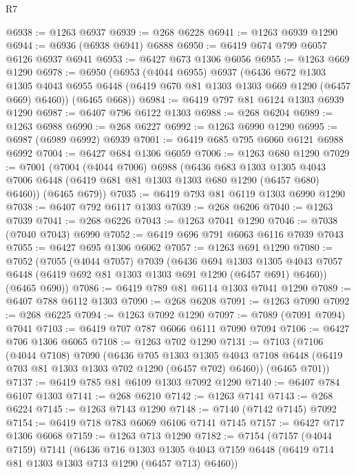 \begin{lexlean}{R7}
\begin{coremodule}
@6938 := @1263 @6937
@6939 := @268 @6228
@6941 := @1263 @6939 @1290
@6944 := @6936 (@6938 @6941) @6888
@6950 := @6419 @674 @799 @6057 @6126 @6937 @6941
@6953 := @6427 @673 @1306 @6056
@6955 := @1263 @669 @1290
@6978 := @6950
    (@6953
      (@4044 @6955)
      @6937
      (@6436
        @672
        @1303
        @1305
        @4043
        @6955
        @6448
        (@6419 @670 @81 @1303 @1303 @669 @1290 (@6457 @669) @6460))
      (@6465 @668))
@6984 := @6419 @797 @81 @6124 @1303 @6939 @1290
@6987 := @6407 @796 @6122 @1303
@6988 := @268 @6204
@6989 := @1263 @6988
@6990 := @268 @6227
@6992 := @1263 @6990 @1290
@6995 := @6987 (@6989 @6992) @6939
@7001 := @6419 @685 @795 @6060 @6121 @6988 @6992
@7004 := @6427 @684 @1306 @6059
@7006 := @1263 @680 @1290
@7029 := @7001
    (@7004
      (@4044 @7006)
      @6988
      (@6436
        @683
        @1303
        @1305
        @4043
        @7006
        @6448
        (@6419 @681 @81 @1303 @1303 @680 @1290 (@6457 @680) @6460))
      (@6465 @679))
@7035 := @6419 @793 @81 @6119 @1303 @6990 @1290
@7038 := @6407 @792 @6117 @1303
@7039 := @268 @6206
@7040 := @1263 @7039
@7041 := @268 @6226
@7043 := @1263 @7041 @1290
@7046 := @7038 (@7040 @7043) @6990
@7052 := @6419 @696 @791 @6063 @6116 @7039 @7043
@7055 := @6427 @695 @1306 @6062
@7057 := @1263 @691 @1290
@7080 := @7052
    (@7055
      (@4044 @7057)
      @7039
      (@6436
        @694
        @1303
        @1305
        @4043
        @7057
        @6448
        (@6419 @692 @81 @1303 @1303 @691 @1290 (@6457 @691) @6460))
      (@6465 @690))
@7086 := @6419 @789 @81 @6114 @1303 @7041 @1290
@7089 := @6407 @788 @6112 @1303
@7090 := @268 @6208
@7091 := @1263 @7090
@7092 := @268 @6225
@7094 := @1263 @7092 @1290
@7097 := @7089 (@7091 @7094) @7041
@7103 := @6419 @707 @787 @6066 @6111 @7090 @7094
@7106 := @6427 @706 @1306 @6065
@7108 := @1263 @702 @1290
@7131 := @7103
    (@7106
      (@4044 @7108)
      @7090
      (@6436
        @705
        @1303
        @1305
        @4043
        @7108
        @6448
        (@6419 @703 @81 @1303 @1303 @702 @1290 (@6457 @702) @6460))
      (@6465 @701))
@7137 := @6419 @785 @81 @6109 @1303 @7092 @1290
@7140 := @6407 @784 @6107 @1303
@7141 := @268 @6210
@7142 := @1263 @7141
@7143 := @268 @6224
@7145 := @1263 @7143 @1290
@7148 := @7140 (@7142 @7145) @7092
@7154 := @6419 @718 @783 @6069 @6106 @7141 @7145
@7157 := @6427 @717 @1306 @6068
@7159 := @1263 @713 @1290
@7182 := @7154
    (@7157
      (@4044 @7159)
      @7141
      (@6436
        @716
        @1303
        @1305
        @4043
        @7159
        @6448
        (@6419 @714 @81 @1303 @1303 @713 @1290 (@6457 @713) @6460))

\end{coremodule}
\end{lexlean}
